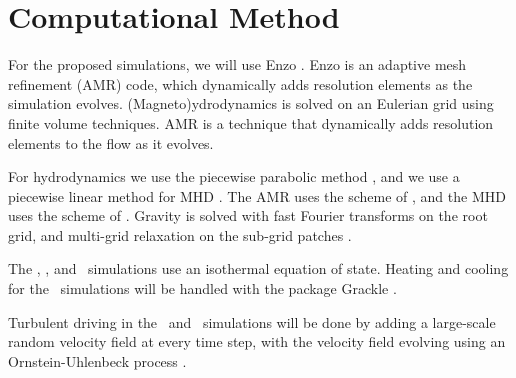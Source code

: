 \section{Computational Method}
\label{sec.method}

For the proposed simulations, we will use Enzo \citep{Collins10, Bryan14}.  Enzo
is an adaptive mesh refinement (AMR) code, which dynamically adds resolution
elements as the simulation evolves.  (Magneto)ydrodynamics is solved on an Eulerian grid
using finite volume techniques.  AMR is a technique that dynamically adds
resolution elements to the flow as it evolves.  

For hydrodynamics we use the
piecewise parabolic method \citep{Colella84}, and we use a piecewise linear
method for MHD \citep{Li08a}.  The AMR uses the scheme of \citet{Berger89}, and
the MHD uses the scheme of \citet{Balsara01}.  Gravity is solved with fast
Fourier transforms on the root grid, and multi-grid relaxation on the sub-grid
patches \citep{Bryan14}.  

The \nameTurbulence, \nameCores, and  \nameCMB\ simulations use an isothermal
equation of state.  Heating and cooling for the \nameGalaxies\ simulations will
be handled with the package Grackle \citep{Smith17}.

Turbulent driving in the \nameTurbulence\ and \nameCMB\ simulations will be
done by adding a large-scale random velocity field at every time step, with the
velocity field evolving using an Ornstein-Uhlenbeck process \citep{Schmidt09}.




